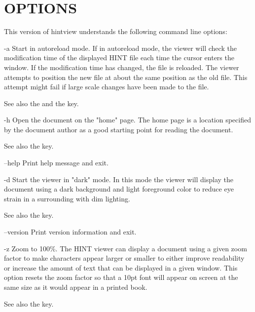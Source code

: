 \section{OPTIONS}
       This  version  of  hintview  understands the following command line options:
       
\itemize
\item{-a}     Start in autoreload mode. If in autoreload mode, the viewer will
              check the modification time of the displayed HINT file each time
              the cursor enters the window.   If  the  modification  time  has
              changed,  the file is reloaded.  The viewer attempts to position
              the new file at about the same position as the  old  file.  This
              attempt  might fail if large scale changes have been made to the
              file.

              See also the  and the  key.

\item{-h}     Open the document on the "home" page. The home page is  a  location
              specified  by the document author as a good starting point
              for reading the document.

              See also the  key.

\item{--help} Print help message and exit.

\item{-d}     Start the viewer in "dark" mode. In this mode the  viewer  will
              display  the  document  using  a dark background and light foreground
              color to reduce eye strain  in  a  surrounding  with  dim
              lighting.

              See also the  key.

\item{--version}
              Print version information and exit.

\item{-z}     Zoom  to  100\%.  The  HINT viewer can display a document using a
              given zoom factor to make characters appear larger or smaller to
              either  improve  readability or increase the amount of text that
              can be displayed in a given window. This option resets the  zoom
              factor  so  that  a  10pt font will appear on screen at the same
              size as it would appear in a printed book.

              See also the  key.
              

